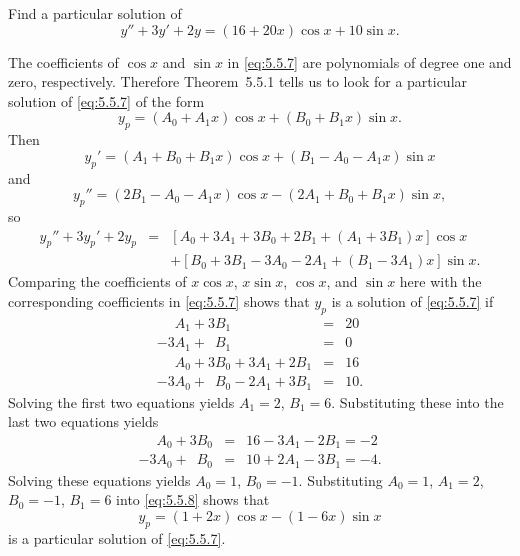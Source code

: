 \setcounter{example}{2}
\setcounter{equation}{6}
\begin{example}
  \label{example:5.5.3} \rm Find a particular solution of
  \begin{equation}
    \label{eq:5.5.7}y''+3y'+2y=(16+20x)\cos x+10\sin x.
  \end{equation}
\end{example}
\setcounter{equation}{7}
\begin{examplesolution}
\solution The coefficients of $\cos x$ and $\sin x$ in \eqref{eq:5.5.7} are polynomials of degree
one and zero, respectively. Therefore Theorem~5.5.1 tells us to look for a particular
solution of \eqref{eq:5.5.7} of the form
\begin{equation}
  \label{eq:5.5.8}y_{p}=(A_{0}+A_{1}x)\cos x+(B_{0}+B_{1}x)\sin x.
\end{equation}
Then
\begin{equation}
  \label{eq:5.5.9}y_{p}'=(A_{1}+B_{0}+B_{1}x)\cos x+(B_{1}-A_{0}-A_{1}x)\sin x
\end{equation}
and
\begin{equation}
  \label{eq:5.5.10}y_{p}''=(2B_{1}-A_{0}-A_{1}x)\cos x-(2A_{1}+B_{0}+B_{1}x)\sin x,
\end{equation}
so
\begin{equation}
  \label{eq:5.5.11}
  \begin{array}{rcl}
    y_{p}''+3y_{p}'+2y_{p} & = & \left[A_{0}+3A_{1}+3B_{0}+2B_{1}+(A_{1}+3B_{1})x\right]\cos x   \\
                           &   & +\left[B_{0}+3B_{1}-3A_{0}-2A_{1}+(B_{1}-3A_{1})x\right]\sin x.
  \end{array}
\end{equation}
Comparing the coefficients of $x\cos x$, $x\sin x$, $\cos x$, and $\sin x$ here with the
corresponding coefficients in \eqref{eq:5.5.7} shows that $y_{p}$ is a solution of \eqref{eq:5.5.7}
if
\[
  \begin{array}{rcr}
    \phantom{-3}A_{1}+3B_{1}               & = & 20\phantom{.} \\
    -3A_{1}+\phantom{3}B_{1}               & = & 0\phantom{.}  \\
    \phantom{-3}A_{0}+3B_{0}+3A_{1}+2B_{1} & = & 16\phantom{.} \\
    -3A_{0}+\phantom{3}B_{0}-2A_{1}+3B_{1} & = & 10.
  \end{array}
\]
Solving the first two equations yields $A_{1}=2$, $B_{1}=6$. Substituting these into the last two
equations yields
\begin{eqnarray*}
  \phantom{-3}A_{0}+3B_{0} & = & 16-3A_{1}-2B_{1}=-2\phantom{.} \\
  -3A_{0}+\phantom{3}B_{0} & = & 10+2A_{1}-3B_{1}=-4.
\end{eqnarray*}
Solving these equations yields $A_{0}=1$, $B_{0}=-1$. Substituting $A_{0}=1$, $A_{1}=2$, $B_{0}=-1$,
$B_{1}=6$ into \eqref{eq:5.5.8} shows that
\[
  y_{p}=(1+2x)\cos x-(1-6x)\sin x
\]
is a particular solution of \eqref{eq:5.5.7}.
\end{examplesolution}

